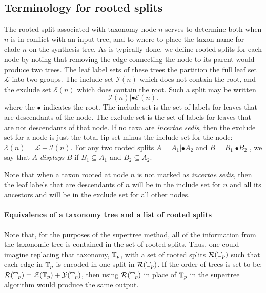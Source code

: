 \documentclass[english]{article}
\begin{document}
\subsection{Terminology for rooted splits}

The rooted split associated with taxonomy node $n$ serves to determine both when $n$ is in conflict
with an input tree, and to where to place the taxon name for clade $n$ on the synthesis tree.
As is typically done, we define rooted splits for each node by noting that
removing the edge connecting the node to its parent would produce two trees.
The leaf label sets of these trees
the partition the full leaf set $\mathcal{L}$ into two groups.
The include set $\mathcal{I}(n)$ which
does not contain the root, and the exclude set $\mathcal{E}(n)$ which does contain the root.
Such a split may be written
\[ \mathcal{I}(n)|\bullet\mathcal{E}(n).\]
where the $\bullet$ indicates the root. 
The include set is the set of labels for leaves that are
descendants of the node.
The exclude set is the set of
labels for leaves that are not descendants of that node. 
If no taxa are \emph{incertae sedis},
then the exclude set for a node is just the total tip set minus the include set
for the node: $\mathcal{E}(n)  =\mathcal{L}-\mathcal{I}(n)$.
For any two rooted splits $A=A_{1}|\bullet A_{2}$
and $B=B_{1}|\bullet B_{2}$ , we say that $A$ \emph{displays }$B$ if $B_{1}\subseteq A_{1}$ and $B_{2}\subseteq A_{2}$.

Note that when a taxon rooted at node $n$ is not marked as \emph{incertae sedis},
then the leaf labels that are descendants of $n$ will be in the include set for
$n$ and all its ancestors and will be in the exclude set for all other nodes.

\paragraph{Equivalence of a taxonomy tree and a list of rooted splits}

Note that, for the purposes of the supertree method, all of the information from
the taxonomic tree is contained in the set of rooted splits. Thus, one could
imagine replacing that taxonomy, $\mbox{\ensuremath{\mathbb{T}}}_{p}$, with a set of rooted splits $\mathcal{R}(\mbox{\ensuremath{\mathbb{T}}}_{p})$ such that
each edge in $\mbox{\ensuremath{\mathbb{T}}}_{p}$ is encoded in one split in $\mathcal{R}(\mbox{\ensuremath{\mathbb{T}}}_{p})$. If the order of trees is set
to be: $\mathcal{R}(\mbox{\ensuremath{\mathbb{T}}}_{p})=\mathcal{Z}(\mbox{\ensuremath{\mathbb{T}}}_{p}) + 
\mathcal{Y}(\mbox{\ensuremath{\mathbb{T}}}_{p})$, then using $\mathcal{R}(\mbox{\ensuremath{\mathbb{T}}}_{p})$ in place of $\mbox{\ensuremath{\mathbb{T}}}_{p}$ in the supertree
algorithm would produce the same output.
\end{document}
